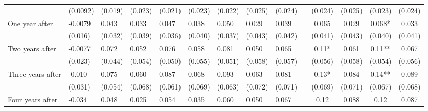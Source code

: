 \begin{tabular}{lccccrrrrrcccc}
      & \multicolumn{1}{l}{(0.0092)} & \multicolumn{1}{l}{(0.019)} & \multicolumn{1}{l}{(0.023)} & \multicolumn{1}{l}{(0.021)} & \multicolumn{1}{l}{(0.023)} & \multicolumn{1}{l}{(0.022)} & \multicolumn{1}{l}{(0.025)} & \multicolumn{1}{l}{(0.024)} &       & (0.024) & (0.025) & (0.023) & (0.024) \\
One year after & \multicolumn{1}{l}{-0.0079} & \multicolumn{1}{l}{0.043} & \multicolumn{1}{l}{0.033} & \multicolumn{1}{l}{0.047} & \multicolumn{1}{l}{0.038} & \multicolumn{1}{l}{0.050} & \multicolumn{1}{l}{0.029} & \multicolumn{1}{l}{0.039} &       & 0.065 & 0.029 & 0.068* & 0.033 \\
      & \multicolumn{1}{l}{(0.016)} & \multicolumn{1}{l}{(0.032)} & \multicolumn{1}{l}{(0.039)} & \multicolumn{1}{l}{(0.036)} & \multicolumn{1}{l}{(0.040)} & \multicolumn{1}{l}{(0.037)} & \multicolumn{1}{l}{(0.043)} & \multicolumn{1}{l}{(0.042)} &       & (0.041) & (0.043) & (0.040) & (0.041) \\
Two years after & \multicolumn{1}{l}{-0.0077} & \multicolumn{1}{l}{0.072} & \multicolumn{1}{l}{0.052} & \multicolumn{1}{l}{0.076} & \multicolumn{1}{l}{0.058} & \multicolumn{1}{l}{0.081} & \multicolumn{1}{l}{0.050} & \multicolumn{1}{l}{0.065} &       & 0.11* & 0.061 & 0.11** & 0.067 \\
      & \multicolumn{1}{l}{(0.023)} & \multicolumn{1}{l}{(0.044)} & \multicolumn{1}{l}{(0.054)} & \multicolumn{1}{l}{(0.050)} & \multicolumn{1}{l}{(0.055)} & \multicolumn{1}{l}{(0.051)} & \multicolumn{1}{l}{(0.058)} & \multicolumn{1}{l}{(0.057)} &       & (0.056) & (0.058) & (0.054) & (0.056) \\
Three years after & \multicolumn{1}{l}{-0.010} & \multicolumn{1}{l}{0.075} & \multicolumn{1}{l}{0.060} & \multicolumn{1}{l}{0.087} & \multicolumn{1}{l}{0.068} & \multicolumn{1}{l}{0.093} & \multicolumn{1}{l}{0.063} & \multicolumn{1}{l}{0.081} &       & 0.13* & 0.084 & 0.14** & 0.089 \\
      & \multicolumn{1}{l}{(0.031)} & \multicolumn{1}{l}{(0.054)} & \multicolumn{1}{l}{(0.068)} & \multicolumn{1}{l}{(0.061)} & \multicolumn{1}{l}{(0.069)} & \multicolumn{1}{l}{(0.063)} & \multicolumn{1}{l}{(0.072)} & \multicolumn{1}{l}{(0.071)} &       & (0.069) & (0.071) & (0.067) & (0.068) \\
Four years after & \multicolumn{1}{l}{-0.034} & \multicolumn{1}{l}{0.048} & \multicolumn{1}{l}{0.025} & \multicolumn{1}{l}{0.054} & \multicolumn{1}{l}{0.035} & \multicolumn{1}{l}{0.060} & \multicolumn{1}{l}{0.050} & \multicolumn{1}{l}{0.067} &       & 0.12  & 0.088 & 0.12  & 0.087 \\

\end{tabular}
